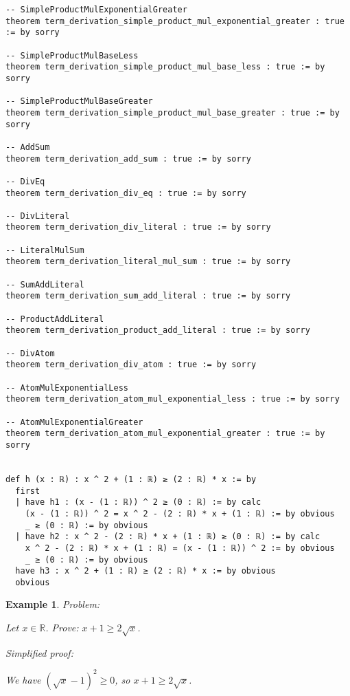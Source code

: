 \documentclass{article}
\newtheorem{example}{Example}
\begin{document}
\begin{tcolorbox}[colback=white!10, width=\linewidth]
\begin{lstlisting}[language=Lean4]
-- SimpleProductMulExponentialGreater
theorem term_derivation_simple_product_mul_exponential_greater : true := by sorry

-- SimpleProductMulBaseLess
theorem term_derivation_simple_product_mul_base_less : true := by sorry

-- SimpleProductMulBaseGreater
theorem term_derivation_simple_product_mul_base_greater : true := by sorry

-- AddSum
theorem term_derivation_add_sum : true := by sorry

-- DivEq
theorem term_derivation_div_eq : true := by sorry

-- DivLiteral
theorem term_derivation_div_literal : true := by sorry

-- LiteralMulSum
theorem term_derivation_literal_mul_sum : true := by sorry

-- SumAddLiteral
theorem term_derivation_sum_add_literal : true := by sorry

-- ProductAddLiteral
theorem term_derivation_product_add_literal : true := by sorry

-- DivAtom
theorem term_derivation_div_atom : true := by sorry

-- AtomMulExponentialLess
theorem term_derivation_atom_mul_exponential_less : true := by sorry

-- AtomMulExponentialGreater
theorem term_derivation_atom_mul_exponential_greater : true := by sorry


def h (x : ℝ) : x ^ 2 + (1 : ℝ) ≥ (2 : ℝ) * x := by
  first
  | have h1 : (x - (1 : ℝ)) ^ 2 ≥ (0 : ℝ) := by calc
    (x - (1 : ℝ)) ^ 2 = x ^ 2 - (2 : ℝ) * x + (1 : ℝ) := by obvious
    _ ≥ (0 : ℝ) := by obvious
  | have h2 : x ^ 2 - (2 : ℝ) * x + (1 : ℝ) ≥ (0 : ℝ) := by calc
    x ^ 2 - (2 : ℝ) * x + (1 : ℝ) = (x - (1 : ℝ)) ^ 2 := by obvious
    _ ≥ (0 : ℝ) := by obvious
  have h3 : x ^ 2 + (1 : ℝ) ≥ (2 : ℝ) * x := by obvious
  obvious

\end{lstlisting}
\end{tcolorbox}


\begin{example}
Problem:
\begin{tcolorbox}[colback=yellow!10, width=\linewidth]
Let $x\in\mathbb{R}$. Prove: $x + 1 \ge 2\sqrt{x}$.
\end{tcolorbox}

Simplified proof:
\begin{tcolorbox}[colback=blue!10, width=\linewidth]
We have $(\sqrt{x}-1)^2 \ge 0$, so $x+1 \ge 2\sqrt{x}$.
\end{tcolorbox}
\end{example}
\end{document}
